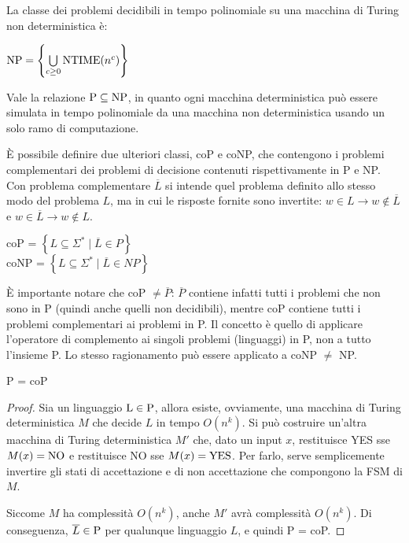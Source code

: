 \begin{rem}
    La classe dei problemi decidibili in tempo polinomiale su una macchina di Turing non deterministica è:
    \begin{center}
        $\textnormal{NP} = \left\{ \bigcup\limits_{c \ge 0} \textnormal{NTIME}(n^c) \right\}$
    \end{center}
\end{rem}

\begin{rem}
    Vale la relazione $\textnormal{P} \subseteq \textnormal{NP}$, in quanto ogni macchina deterministica può essere simulata in tempo polinomiale da una macchina non deterministica usando un solo ramo di computazione.
\end{rem}

È possibile definire due ulteriori classi, coP e coNP, che contengono i problemi complementari dei problemi di decisione contenuti rispettivamente in P e NP. Con problema complementare $\overline{L}$ si intende quel problema definito allo stesso modo del problema $L$, ma in cui le risposte fornite sono invertite: $w \in L \rightarrow w \notin \overline{L}$ e $w \in \overline{L} \rightarrow w \notin L$.
\begin{center}
    coP = $\left\{ L \subseteq \Sigma^* \; | \; \overline{L} \in P \right\}$\\
    coNP = $\left\{ L \subseteq \Sigma^* \; | \; \overline{L} \in NP \right\}$
\end{center}

È importante notare che coP $\neq \overline{P}$: $\overline{P}$ contiene infatti tutti i problemi che non sono in P (quindi anche quelli non decidibili), mentre coP contiene tutti i problemi complementari ai problemi in P. Il concetto è quello di applicare l'operatore di complemento ai singoli problemi (linguaggi) in P, non a tutto l'insieme P.
Lo stesso ragionamento può essere applicato a coNP $\neq$ NP.

\begin{thm}
    \textnormal{P = coP}
\end{thm}
\begin{proof}
    Sia un linguaggio $\textnormal{L} \in \textnormal{P}$, allora esiste, ovviamente, una macchina di Turing deterministica $M$ che decide $L$ in tempo $O(n^k)$.
    Si può costruire un'altra macchina di Turing deterministica $M'$ che, dato un input $x$, restituisce YES sse $M(x) = \textnormal{NO}$ e restituisce NO sse $M(x) = \textnormal{YES}$. Per farlo, serve semplicemente invertire gli stati di accettazione e di non accettazione che compongono la FSM di $M$.

    Siccome $M$ ha complessità $O(n^k)$, anche $M'$ avrà complessità $O(n^k)$.
    Di conseguenza, $\overline{L} \in \textnormal{P}$ per qualunque linguaggio $L$, e quindi P = coP.
\end{proof}


